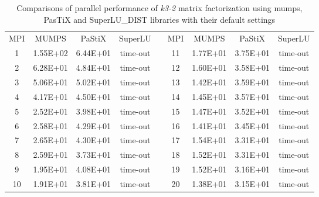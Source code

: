 \begin{table}[ht]
\centering
\begin{tabular}{|c|c|c|c|l|c|c|c|c|}
\cline{1-4} \cline{6-9}
MPI & MUMPS    & PaStiX   & SuperLU &  & MPI & MUMPS    & PaStiX   & SuperLU \\ \cline{1-4} \cline{6-9} 
1   & 1.55E+02 & 6.44E+01 & time-out &  & 11  & 1.77E+01 & 3.75E+01 & time-out \\ \cline{1-4} \cline{6-9} 
2   & 6.28E+01 & 4.84E+01 & time-out &  & 12  & 1.60E+01 & 3.58E+01 & time-out \\ \cline{1-4} \cline{6-9} 
3   & 5.06E+01 & 5.02E+01 & time-out &  & 13  & 1.42E+01 & 3.59E+01 & time-out \\ \cline{1-4} \cline{6-9} 
4   & 4.17E+01 & 4.50E+01 & time-out &  & 14  & 1.45E+01 & 3.57E+01 & time-out \\ \cline{1-4} \cline{6-9} 
5   & 2.52E+01 & 3.98E+01 & time-out &  & 15  & 1.47E+01 & 3.52E+01 & time-out \\ \cline{1-4} \cline{6-9} 
6   & 2.58E+01 & 4.29E+01 & time-out &  & 16  & 1.41E+01 & 3.45E+01 & time-out \\ \cline{1-4} \cline{6-9} 
7   & 2.65E+01 & 4.30E+01 & time-out &  & 17  & 1.54E+01 & 3.31E+01 & time-out \\ \cline{1-4} \cline{6-9} 
8   & 2.59E+01 & 3.73E+01 & time-out &  & 18  & 1.52E+01 & 3.31E+01 & time-out \\ \cline{1-4} \cline{6-9} 
9   & 1.95E+01 & 4.08E+01 & time-out &  & 19  & 1.52E+01 & 3.16E+01 & time-out \\ \cline{1-4} \cline{6-9} 
10  & 1.91E+01 & 3.81E+01 & time-out &  & 20  & 1.38E+01 & 3.15E+01 & time-out \\ \cline{1-4} \cline{6-9} 
\end{tabular}
\caption{Comparisons of parallel performance of  \textit{k3-2} matrix factorization using \gls{mumps}, PasTiX and SuperLU\_DIST libraries with their default settings}
\label{table:app-lc-k3-2-result}
\end{table}


